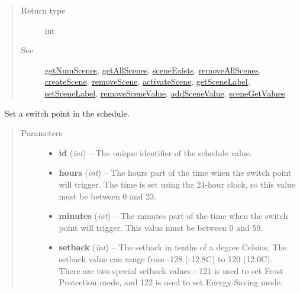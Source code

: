 \documentclass[letterpaper,10pt,english]{sphinxmanual}
\begin{document}
\begin{fulllineitems}
\begin{fulllineitems}
\begin{quote}
\begin{description}
\item[{Return type}] \leavevmode
int

\item[{See}] \leavevmode
{\hyperref[libopenzwave:getnumscenes]{getNumScenes}}, {\hyperref[libopenzwave:getallscenes]{getAllScenes}}, {\hyperref[libopenzwave:sceneexists]{sceneExists}}, {\hyperref[libopenzwave:removeallscenes]{removeAllScenes}}, {\hyperref[libopenzwave:createscene]{createScene}}, {\hyperref[libopenzwave:removescene]{removeScene}}, {\hyperref[libopenzwave:activatescene]{activateScene}}, {\hyperref[libopenzwave:getscenelabel]{getSceneLabel}}, {\hyperref[libopenzwave:setscenelabel]{setSceneLabel}}, {\hyperref[libopenzwave:removescenevalue]{removeSceneValue}}, {\hyperref[libopenzwave:addscenevalue]{addSceneValue}}, {\hyperref[libopenzwave:scenegetvalues]{sceneGetValues}}

\end{description}\end{quote}

\end{fulllineitems}


\begin{fulllineitems}
\label{libopenzwave:libopenzwave.PyManager.setSwitchPoint}~\label{libopenzwave:setswitchpoint}
Set a switch point in the schedule.
\begin{quote}\begin{description}
\item[{Parameters}] \leavevmode\begin{itemize}
\item {} 
\textbf{id} (\emph{int}) -- The unique identifier of the schedule value.

\item {} 
\textbf{hours} (\emph{int}) -- The hours part of the time when the switch point will trigger. The time is set using the 24-hour clock, so this value must be between 0 and 23.

\item {} 
\textbf{minutes} (\emph{int}) -- The minutes part of the time when the switch point will trigger.  This value must be between 0 and 59.

\item {} 
\textbf{setback} (\emph{int}) -- The setback in tenths of a degree Celsius.  The setback value can range from -128 (-12.8C) to 120 (12.0C).  There are two special setback values - 121 is used to set Frost Protection mode, and 122 is used to set Energy Saving mode.


\end{itemize}
\end{description}
\end{quote}
\end{fulllineitems}
\end{fulllineitems}
\end{document}
